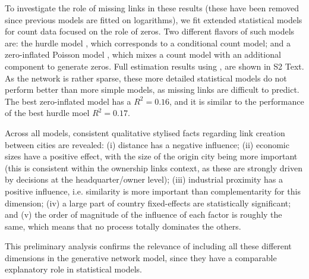 \documentclass[10pt,letterpaper]{article}
\begin{document}
To investigate the role of missing links in these results (these have been removed since previous models are fitted on logarithms), we fit extended statistical models for count data focused on the role of zeros. Two different flavors of such models are: the hurdle model \cite{mullahy1986specification}, which corresponds to a conditional count model; and a zero-inflated Poisson model \cite{lambert1992zero}, which mixes a count model with an additional component to generate zeros. Full estimation results using \cite{zeileis2008regression}, are shown in S2 Text. As the network is rather sparse, these more detailed statistical models do not perform better than more simple models, as missing links are difficult to predict. The best zero-inflated model has a $R^2 = 0.16$, and it is similar to the performance of the best hurdle moel $R^2 = 0.17$.


Across all models, consistent qualitative stylised facts regarding link creation between cities are revealed: (i) distance has a negative influence; (ii) economic sizes have a positive effect, with the size of the origin city being more important (this is consistent within the ownership links context, as these are strongly driven by decisions at the headquarter/owner level); (iii) industrial proximity has a positive influence, i.e. similarity is more important than complementarity for this dimension; (iv) a large part of country fixed-effects are statistically significant; and (v) the order of magnitude of the influence of each factor is roughly the same, which means that no process totally dominates the others.

This preliminary analysis confirms the relevance of including all these different dimensions in the generative network model, since they have a comparable explanatory role in statistical models.
\end{document}
